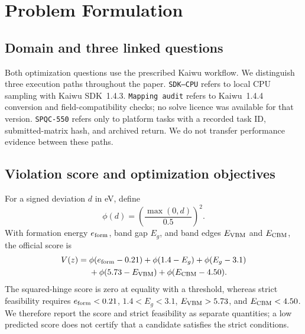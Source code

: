 \section{Problem Formulation}
\label{sec:problem-formulation}

\subsection{Domain and three linked questions}

Both optimization questions use the prescribed Kaiwu workflow.  We
distinguish three execution paths throughout the paper.  \texttt{SDK--CPU}
refers to local CPU sampling with Kaiwu SDK~1.4.3.  \texttt{Mapping audit}
refers to Kaiwu~1.4.4 conversion and field-compatibility checks; no solve
licence was available for that version.  \texttt{SPQC-550} refers only to
platform tasks with a recorded task ID, submitted-matrix hash, and archived
return.  We do not transfer performance evidence between these paths.

\subsection{Violation score and optimization objectives}

For a signed deviation $d$ in eV, define
\begin{equation}
 \phi(d)=\left(\frac{\max(0,d)}{0.5}\right)^2 .
 \label{eq:formulation-hinge}
\end{equation}
With formation energy $e_{\rm form}$, band gap $E_g$, and band edges
$E_{\rm VBM}$ and $E_{\rm CBM}$, the official score is
\begin{align}
 V(z)={}&\phi(e_{\rm form}-0.21)+\phi(1.4-E_g)+\phi(E_g-3.1)\notag\\
       &+\phi(5.73-E_{\rm VBM})+\phi(E_{\rm CBM}-4.50).
 \label{eq:formulation-V}
\end{align}
The squared-hinge score is zero at equality with a threshold, whereas
strict feasibility requires
$e_{\rm form}<0.21$, $1.4<E_g<3.1$, $E_{\rm VBM}>5.73$, and
$E_{\rm CBM}<4.50$.  We therefore report the score and strict feasibility
as separate quantities; a low predicted score does not certify that a
candidate satisfies the strict conditions.

